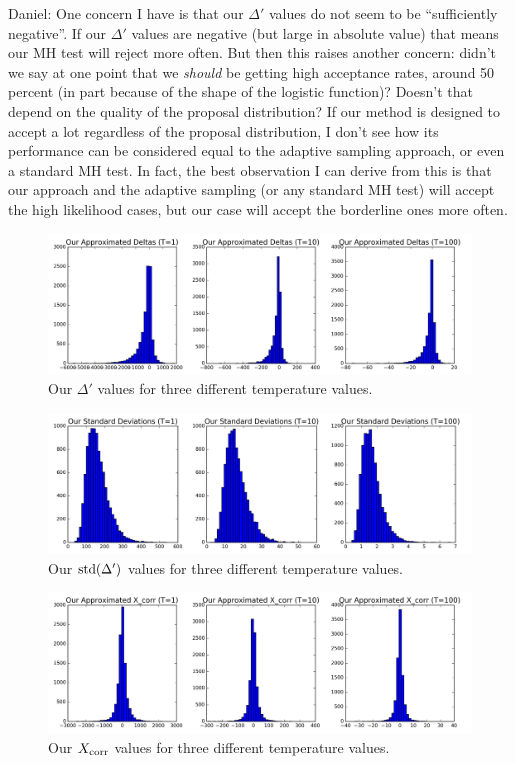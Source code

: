 \documentclass{article}
\begin{document}
{\color{blue}
Daniel: One concern I have is that our $\Delta'$ values do not seem to be ``sufficiently negative''. If our
$\Delta'$ values are negative (but large in absolute value) that means our MH test will reject more
often. But then this raises another concern: didn't we say at one point that we \emph{should} be
getting high acceptance rates, around 50 percent (in part because of the shape of the logistic
function)? Doesn't that depend on the quality of the proposal distribution? If our method is
designed to accept a lot regardless of the proposal distribution, I don't see how its performance
can be considered equal to the adaptive sampling approach, or even a standard MH test. In fact, the
best observation I can derive from this is that our approach and the adaptive sampling (or any
standard MH test) will accept the high likelihood cases, but our case will accept the borderline
ones more often.
}

\begin{figure}[ht]
  \centering
  \includegraphics[width=1\linewidth]{our_deltas_v01.png}
  \caption{Our $\Delta'$ values for three different temperature values.}
  \label{fig:diagnostics1}
\end{figure}

\begin{figure}[ht]
  \centering
  \includegraphics[width=1\linewidth]{our_sds_v01.png}
  \caption{Our ${\rm std}(\Delta')$ values for three different temperature values.}
  \label{fig:diagnostics2}
\end{figure}

\begin{figure}[ht]
  \centering
  \includegraphics[width=1\linewidth]{our_xcorrs_v01.png}
  \caption{Our $X_{\rm corr}$ values for three different temperature values.}
  \label{fig:diagnostics3}
\end{figure}
\end{document}
